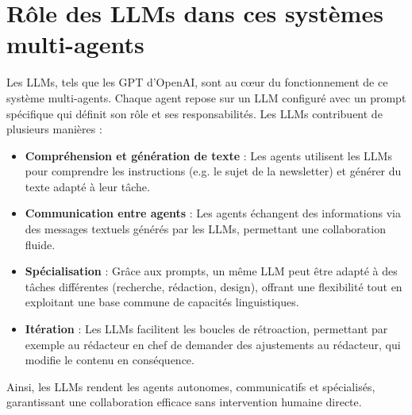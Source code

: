 \documentclass[a4paper,12pt]{article}
\begin{document}
	\section{Rôle des LLMs dans ces systèmes multi-agents}
	Les LLMs, tels que les GPT d'OpenAI, sont au cœur du fonctionnement de ce système multi-agents. Chaque agent repose sur un LLM configuré avec un prompt spécifique qui définit son rôle et ses responsabilités. Les LLMs contribuent de plusieurs manières :
	\begin{itemize}
		\item \textbf{Compréhension et génération de texte} : Les agents utilisent les LLMs pour comprendre les instructions (e.g. le sujet de la newsletter) et générer du texte adapté à leur tâche.
		\item \textbf{Communication entre agents} : Les agents échangent des informations via des messages textuels générés par les LLMs, permettant une collaboration fluide.
		\item \textbf{Spécialisation} : Grâce aux prompts, un même LLM peut être adapté à des tâches différentes (recherche, rédaction, design), offrant une flexibilité tout en exploitant une base commune de capacités linguistiques.
		\item \textbf{Itération} : Les LLMs facilitent les boucles de rétroaction, permettant par exemple au rédacteur en chef de demander des ajustements au rédacteur, qui modifie le contenu en conséquence.
	\end{itemize}
	Ainsi, les LLMs rendent les agents autonomes, communicatifs et spécialisés, garantissant une collaboration efficace sans intervention humaine directe.
		
\end{document}
